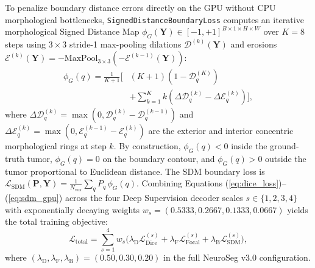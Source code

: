 \documentclass[conference]{IEEEtran}
\begin{document}
To penalize boundary distance errors directly on the GPU without CPU morphological bottlenecks, \texttt{SignedDistanceBoundaryLoss} computes an iterative morphological Signed Distance Map $\phi_G(\mathbf{Y}) \in [-1, +1]^{B \times 1 \times H \times W}$ over $K = 8$ steps using $3\times 3$ stride-1 max-pooling dilations $\mathcal{D}^{(k)}(\mathbf{Y})$ and erosions $\mathcal{E}^{(k)}(\mathbf{Y}) = -\text{MaxPool}_{3\times 3}(-\mathcal{E}^{(k-1)}(\mathbf{Y}))$:
\begin{equation}
\begin{aligned}
    \phi_G(q) = \frac{1}{K+1}\Bigg[&(K+1)\!\left(1 - \mathcal{D}^{(K)}_q\right) \\
    &+ \sum_{k=1}^{K} k\!\left(\Delta\mathcal{D}^{(k)}_q - \Delta\mathcal{E}^{(k)}_q\right)\Bigg],
\end{aligned}
    \label{eq:sdm_gpu}
\end{equation}
where $\Delta\mathcal{D}^{(k)}_q = \max(0, \mathcal{D}^{(k)}_q - \mathcal{D}^{(k-1)}_q)$ and $\Delta\mathcal{E}^{(k)}_q = \max(0, \mathcal{E}^{(k-1)}_q - \mathcal{E}^{(k)}_q)$ are the exterior and interior concentric morphological rings at step $k$. By construction, $\phi_G(q) < 0$ inside the ground-truth tumor, $\phi_G(q) = 0$ on the boundary contour, and $\phi_G(q) > 0$ outside the tumor proportional to Euclidean distance. The SDM boundary loss is $\mathcal{L}_{\text{SDM}}(\mathbf{P},\mathbf{Y}) = \frac{1}{N_{\text{vox}}}\sum_q P_q\,\phi_G(q)$. Combining Equations (\ref{eq:dice_loss})--(\ref{eq:sdm_gpu}) across the four Deep Supervision decoder scales $s \in \{1, 2, 3, 4\}$ with exponentially decaying weights $w_s = (0.5333, 0.2667, 0.1333, 0.0667)$ yields the total training objective:
\begin{equation}
    \mathcal{L}_{\text{total}} = \sum_{s=1}^{4} w_s \Big( \lambda_{\text{D}}\mathcal{L}_{\text{Dice}}^{(s)} + \lambda_{\text{F}}\mathcal{L}_{\text{Focal}}^{(s)} + \lambda_{\text{B}}\mathcal{L}_{\text{SDM}}^{(s)} \Big),
    \label{eq:total_loss}
\end{equation}
where $(\lambda_{\text{D}}, \lambda_{\text{F}}, \lambda_{\text{B}}) = (0.50, 0.30, 0.20)$ in the full NeuroSeg v3.0 configuration.
\end{document}
